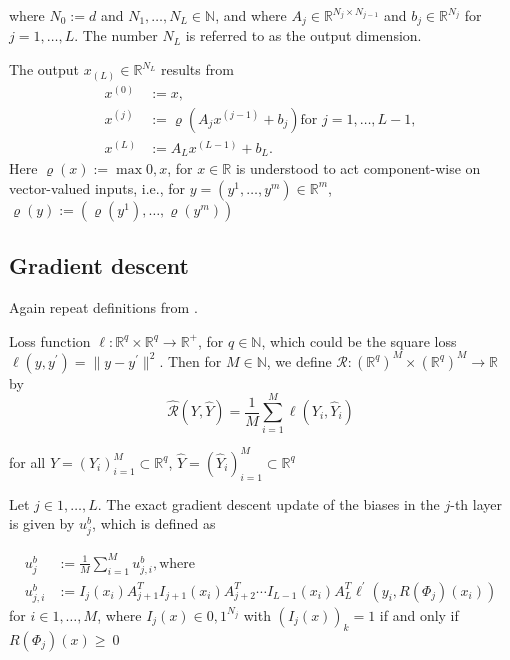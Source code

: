 \documentclass[draft]{article}
\def\RealSet{\mathbb{R}}
\begin{document}
where $N_0 := d$ and $N_1, \ldots , N_L \in \mathbb{N}$, and where $A_j \in \RealSet^{N_{j}\times N_{j-1}}$ and $b_j \in \RealSet^{N_j}$ for $j = 1, \ldots, L$. The number $N_L$ is referred to as the output dimension.

The output $x_{(L)}\in \RealSet^{N_L}$ results from
\begin{align}
x^{(0)} &:= x,\\
x^{(j)} &:= \varrho(A_j x^{(j-1)} + b_j) \text{for $j=1,\dots,L-1$},\\
x^{(L)} &:= A_L x^{(L-1)} + b_L.
\end{align}
Here $\varrho(x) := \max {0,x}$, for $x\in\RealSet$ is understood to act component-wise on vector-valued inputs, i.e., for $y=(y^1,\dots,y^m)\in\RealSet^m$, $\varrho(y) := (\varrho(y^1),\dots,\varrho(y^m))$

\subsection{Gradient descent}

Again repeat definitions from \cite{Karner:2022}.

Loss function $\ell \colon \RealSet^q \times  \RealSet^q \rightarrow  \RealSet^{+}$, for $q \in \mathbb{N}$, which could be the square loss $\ell(y,y^\prime)=\| y - y^\prime \|^2$. Then for $M \in \mathbb{N}$, we define $\mathcal{R} \colon (\RealSet^q)^M \times (\RealSet^q)^M \rightarrow \RealSet$ by
\[
\hat{\mathcal{R}} (Y,\hat Y) = \frac1{M} \sum_{i=1}^M \ell(Y_i, \hat Y_i)
\]

for all $Y=(Y_i)_{i=1}^M \subset \RealSet^q$, $\hat Y = (\hat Y_i)_{i=1}^M \subset \RealSet^q$

Let $j \in {1,\ldots,L}$. The exact gradient descent update of the biases in the $j$-th layer is given by $u_j^b$, which is defined as

\begin{align}
u_j^b &:= \frac1{M} \sum_{i=1}^M u_{j,i}^b, \text{where} \\
u_{j,i}^b &:= I_j(x_i)A_{j+1}^T I_{j+1}(x_i) A_{j+2}^T \cdots I_{L-1}(x_i)A_L^T \ell^\prime(y_i, R(\Phi_j)(x_i))
\end{align}
for $i\in {1,\ldots,M}$, where $I_j(x)\in{0,1}^{N_j}$ with $(I_j(x))_k = 1$ if and only if $R(\Phi_j)(x)\geqslant~0$




\end{document}
